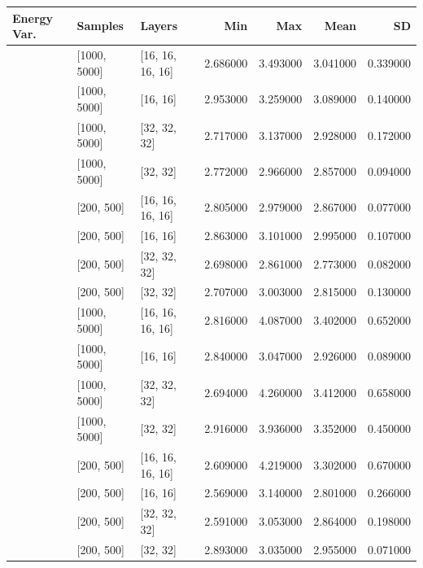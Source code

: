 \begin{tabular}{lllrrrr}
\toprule
Energy Var. & Samples & Layers & Min & Max & Mean & SD \\
\midrule
[0.001, 0.0001] & [1000, 5000] & [16, 16, 16, 16] & 2.686000 & 3.493000 & 3.041000 & 0.339000 \\
[0.001, 0.0001] & [1000, 5000] & [16, 16] & 2.953000 & 3.259000 & 3.089000 & 0.140000 \\
[0.001, 0.0001] & [1000, 5000] & [32, 32, 32] & 2.717000 & 3.137000 & 2.928000 & 0.172000 \\
[0.001, 0.0001] & [1000, 5000] & [32, 32] & 2.772000 & 2.966000 & 2.857000 & 0.094000 \\
[0.001, 0.0001] & [200, 500] & [16, 16, 16, 16] & 2.805000 & 2.979000 & 2.867000 & 0.077000 \\
[0.001, 0.0001] & [200, 500] & [16, 16] & 2.863000 & 3.101000 & 2.995000 & 0.107000 \\
[0.001, 0.0001] & [200, 500] & [32, 32, 32] & 2.698000 & 2.861000 & 2.773000 & 0.082000 \\
[0.001, 0.0001] & [200, 500] & [32, 32] & 2.707000 & 3.003000 & 2.815000 & 0.130000 \\
[0.1, 0.01] & [1000, 5000] & [16, 16, 16, 16] & 2.816000 & 4.087000 & 3.402000 & 0.652000 \\
[0.1, 0.01] & [1000, 5000] & [16, 16] & 2.840000 & 3.047000 & 2.926000 & 0.089000 \\
[0.1, 0.01] & [1000, 5000] & [32, 32, 32] & 2.694000 & 4.260000 & 3.412000 & 0.658000 \\
[0.1, 0.01] & [1000, 5000] & [32, 32] & 2.916000 & 3.936000 & 3.352000 & 0.450000 \\
[0.1, 0.01] & [200, 500] & [16, 16, 16, 16] & 2.609000 & 4.219000 & 3.302000 & 0.670000 \\
[0.1, 0.01] & [200, 500] & [16, 16] & 2.569000 & 3.140000 & 2.801000 & 0.266000 \\
[0.1, 0.01] & [200, 500] & [32, 32, 32] & 2.591000 & 3.053000 & 2.864000 & 0.198000 \\
[0.1, 0.01] & [200, 500] & [32, 32] & 2.893000 & 3.035000 & 2.955000 & 0.071000 \\
\bottomrule
\end{tabular}
